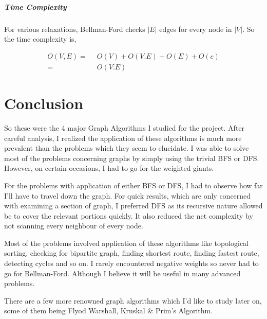 \documentclass[11pt,a4paper]{extarticle}
\begin{document}
\subparagraph{Time Complexity}
For various relaxations, Bellman-Ford checks $|E|$ edges for every node in $|V|$. So the time complexity is,

\begin{align}
O(V,E) =& \,\,\,O(V) + O(V.E) + O(E) + O(c)\\
	   =& \,\,\,O(V.E)
\end{align}

\section{Conclusion}
So these were the 4 major Graph Algorithms I studied for the project. After careful analysis, I realized the application of these algorithms is much more prevalent than the problems which they seem to elucidate. I was able to solve most of the problems concerning graphs by simply using the trivial BFS or DFS. However, on certain occasions, I had to go for the weighted giants. 

For the problems with application of either BFS or DFS, I had to observe how far I'll have to travel down the graph. For quick results, which are only concerned with examining a section of graph, I preferred DFS as its recursive nature allowed be to cover the relevant portions quickly. It also reduced the net complexity by not scanning every neighbour of every node.

Most of the problems involved application of these algorithms like topological sorting, checking for bipartite graph, finding shortest route, finding fastest route, detecting cycles and so on. I rarely encountered negative weights so never had to go for Bellman-Ford. Although I believe it will be useful in many advanced problems.

There are a few more renowned graph algorithms which I'd like to study later on, some of them being Flyod Warshall, Kruskal \& Prim's Algorithm. 
\end{document}
